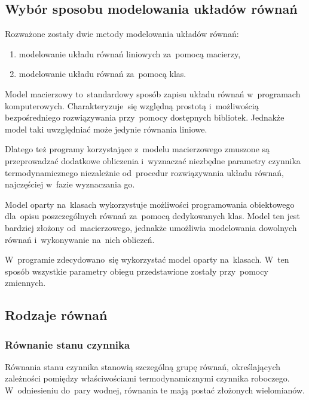 \subsection{Wybór sposobu modelowania układów równań}

Rozważone zostały dwie metody modelowania układów równań:

\begin{enumerate}

	\item modelowanie układu równań liniowych za~pomocą macierzy,

	\item modelowanie układu równań za~pomocą klas.

\end{enumerate}

Model macierzowy to~standardowy sposób zapisu układu równań w~programach
komputerowych. Charakteryzuje~się względną prostotą i~możliwością
bezpośredniego rozwiązywania przy~pomocy dostępnych bibliotek. Jednakże
model taki uwzględniać może jedynie równania liniowe.

Dlatego też programy korzystające z~modelu macierzowego zmuszone są
przeprowadzać dodatkowe obliczenia i~wyznaczać niezbędne parametry
czynnika termodynamicznego niezależnie od~procedur rozwiązywania układu
równań, najczęściej w~fazie wyznaczania go.

Model oparty na~klasach wykorzystuje możliwości programowania
obiektowego dla~opisu poszczególnych równań za~pomocą dedykowanych klas.
Model ten jest bardziej złożony od~macierzowego, jednakże umożliwia
modelowania dowolnych równań i~wykonywanie na~nich obliczeń.

W~programie zdecydowano~się wykorzystać model oparty na~klasach. W~ten
sposób wszystkie parametry obiegu przedstawione zostały przy~pomocy
zmiennych.


\subsection{Rodzaje równań}

\subsubsection{Równanie stanu czynnika}

Równania stanu czynnika stanowią szczególną grupę równań, określających
zależności pomiędzy właściwościami termodynamicznymi czynnika roboczego.
W~odniesieniu do~pary wodnej, równania te mają postać złożonych
wielomianów.


